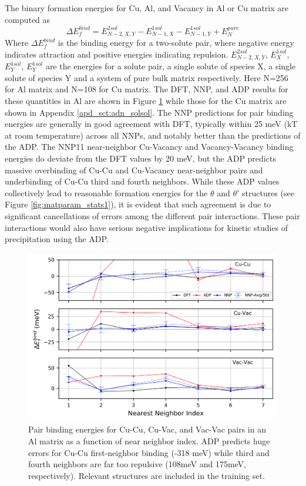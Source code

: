 \documentclass{article}
\begin{document}
The binary formation energies for Cu, Al, and Vacancy in Al or Cu matrix are computed as
\begin{equation}
\Delta E^{bind}_f = E^{2sol}_{N-2,X,Y}-E^{1sol}_{N-1,X}-E^{1sol}_{N-1,Y}+E^{pure}_N
\end{equation}
Where $\Delta E^{bind}_f$ is the binding energy for a two-solute pair, where negative energy indicates attraction and positive energies indicating repulsion.
$E^{2sol}_{N-2,X,Y}$, $E^{1sol}_{X}$, $E^{1sol}_{Y}$, $E^{1sol}_{Y}$ are the energies for a solute pair, a single solute of species X, a single solute of species Y and a system of pure bulk matrix respectively. 
Here N=256 for Al matrix and N=108 for Cu matrix. 
The DFT, NNP, and ADP results for these quantities in Al are shown in Figure \ref{fig:solsol_in_al} while those for the Cu matrix are shown in Appendix \ref{apd_sct:adn_solsol}.  The NNP predictions for pair binding energies are generally in good agreement with DFT, typically within 25 meV (kT at room temperature) across all NNPs, and notably better than the predictions of the ADP.  The NNP11 near-neighbor Cu-Vacancy and Vacancy-Vacancy binding energies do deviate from the DFT values by 20 meV, but the ADP predicts massive overbinding of Cu-Cu and Cu-Vacancy near-neighbor pairs and underbinding of Cu-Cu third and fourth neighbors.  While these ADP values collectively lead to reasonable formation energies for the $\theta$ and $\theta'$ structures (see Figure \ref{fig:matparam_stats1}), it is evident that such agreement is due to significant cancellations of errors among the different pair interactions.  These pair interactions would also have serious negative implications for kinetic studies of precipitation using the ADP.

\begin{figure}[H]%
\centering%
\includegraphics[width=1\textwidth,center]{./figures/solsol_in_al.png}%
\caption{Pair binding energies for Cu-Cu, Cu-Vac, and Vac-Vac pairs in an Al matrix as a function of near neighbor index. 
ADP predicts huge errors for Cu-Cu first-neighbor binding (-318 meV) 
while third and fourth neighbors are far too repulsive (108meV and 175meV, respectively). 
Relevant structures are included in the training set.
}%
\label{fig:solsol_in_al}
\end{figure}
\end{document}
